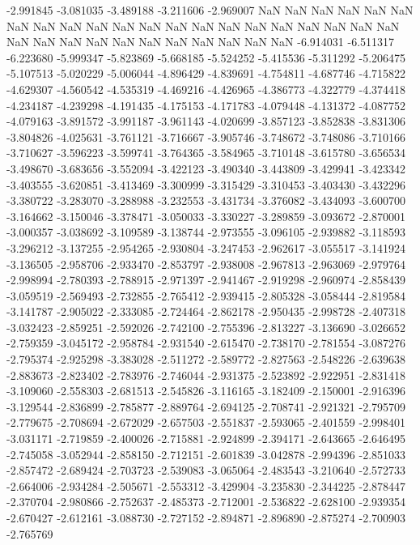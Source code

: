 -2.991845
-3.081035
-3.489188
-3.211606
-2.969007
NaN
NaN
NaN
NaN
NaN
NaN
NaN
NaN
NaN
NaN
NaN
NaN
NaN
NaN
NaN
NaN
NaN
NaN
NaN
NaN
NaN
NaN
NaN
NaN
NaN
NaN
NaN
NaN
NaN
NaN
NaN
NaN
-6.914031
-6.511317
-6.223680
-5.999347
-5.823869
-5.668185
-5.524252
-5.415536
-5.311292
-5.206475
-5.107513
-5.020229
-5.006044
-4.896429
-4.839691
-4.754811
-4.687746
-4.715822
-4.629307
-4.560542
-4.535319
-4.469216
-4.426965
-4.386773
-4.322779
-4.374418
-4.234187
-4.239298
-4.191435
-4.175153
-4.171783
-4.079448
-4.131372
-4.087752
-4.079163
-3.891572
-3.991187
-3.961143
-4.020699
-3.857123
-3.852838
-3.831306
-3.804826
-4.025631
-3.761121
-3.716667
-3.905746
-3.748672
-3.748086
-3.710166
-3.710627
-3.596223
-3.599741
-3.764365
-3.584965
-3.710148
-3.615780
-3.656534
-3.498670
-3.683656
-3.552094
-3.422123
-3.490340
-3.443809
-3.429941
-3.423342
-3.403555
-3.620851
-3.413469
-3.300999
-3.315429
-3.310453
-3.403430
-3.432296
-3.380722
-3.283070
-3.288988
-3.232553
-3.431734
-3.376082
-3.434093
-3.600700
-3.164662
-3.150046
-3.378471
-3.050033
-3.330227
-3.289859
-3.093672
-2.870001
-3.000357
-3.038692
-3.109589
-3.138744
-2.973555
-3.096105
-2.939882
-3.118593
-3.296212
-3.137255
-2.954265
-2.930804
-3.247453
-2.962617
-3.055517
-3.141924
-3.136505
-2.958706
-2.933470
-2.853797
-2.938008
-2.967813
-2.963069
-2.979764
-2.998994
-2.780393
-2.788915
-2.971397
-2.941467
-2.919298
-2.960974
-2.858439
-3.059519
-2.569493
-2.732855
-2.765412
-2.939415
-2.805328
-3.058444
-2.819584
-3.141787
-2.905022
-2.333085
-2.724464
-2.862178
-2.950435
-2.998728
-2.407318
-3.032423
-2.859251
-2.592026
-2.742100
-2.755396
-2.813227
-3.136690
-3.026652
-2.759359
-3.045172
-2.958784
-2.931540
-2.615470
-2.738170
-2.781554
-3.087276
-2.795374
-2.925298
-3.383028
-2.511272
-2.589772
-2.827563
-2.548226
-2.639638
-2.883673
-2.823402
-2.783976
-2.746044
-2.931375
-2.523892
-2.922951
-2.831418
-3.109060
-2.558303
-2.681513
-2.545826
-3.116165
-3.182409
-2.150001
-2.916396
-3.129544
-2.836899
-2.785877
-2.889764
-2.694125
-2.708741
-2.921321
-2.795709
-2.779675
-2.708694
-2.672029
-2.657503
-2.551837
-2.593065
-2.401559
-2.998401
-3.031171
-2.719859
-2.400026
-2.715881
-2.924899
-2.394171
-2.643665
-2.646495
-2.745058
-3.052944
-2.858150
-2.712151
-2.601839
-3.042878
-2.994396
-2.851033
-2.857472
-2.689424
-2.703723
-2.539083
-3.065064
-2.483543
-3.210640
-2.572733
-2.664006
-2.934284
-2.505671
-2.553312
-3.429904
-3.235830
-2.344225
-2.878447
-2.370704
-2.980866
-2.752637
-2.485373
-2.712001
-2.536822
-2.628100
-2.939354
-2.670427
-2.612161
-3.088730
-2.727152
-2.894871
-2.896890
-2.875274
-2.700903
-2.765769

